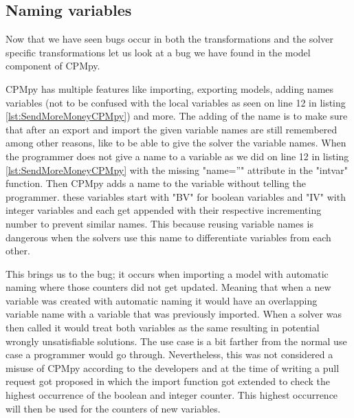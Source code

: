 %
%

\subsection{Naming variables}
\label{res:bug:Naming+andImport}
Now that we have seen bugs occur in both the transformations and the solver specific transformations let us look at a bug we have found in the model component of CPMpy. 

CPMpy has multiple features like importing, exporting models, adding names variables (not to be confused with the local variables as seen on line 12 in listing \ref{lst:SendMoreMoneyCPMpy}) and more. The adding of the name is to make sure that after an export and import the given variable names are still remembered among other reasons, like to be able to give the solver the variable names. When the programmer does not give a name to a variable as we did on line 12 in listing \ref{lst:SendMoreMoneyCPMpy} with the missing "name=''" attribute in the "intvar" function. Then CPMpy adds a name to the variable without telling the programmer. these variables start with "BV" for boolean variables and "IV" with integer variables and each get appended with their respective incrementing number to prevent similar names. This because reusing variable names is dangerous when the solvers use this name to differentiate variables from each other.

This brings us to the bug; it occurs when importing a model with automatic naming where those counters did not get updated. Meaning that when a new variable was created with automatic naming it would have an overlapping variable name with a variable that was previously imported. When a solver was then called it would treat both variables as the same resulting in potential wrongly unsatisfiable solutions. The use case is a bit farther from the normal use case a programmer would go through. Nevertheless, this was not considered a misuse of CPMpy according to the developers and at the time of writing a pull request got proposed in which the import function got extended to check the highest occurrence of the boolean and integer counter. This highest occurrence will then be used for the counters of new variables.

